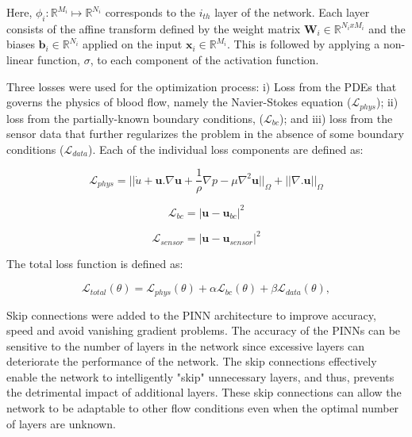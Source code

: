 \documentclass[times,twocolumn,final]{elsarticle}
\begin{document}
{Here, $\phi_{i}:\mathbb{R}^{M_{i}} \longmapsto \mathbb{R}^{N_{i}}$ corresponds to the $i_{th}$ layer of the network. Each layer consists of the affine transform defined by the weight matrix $\textbf{W}_{i} \in \mathbb{R}^{N_{i} x M_{i}}$ and the biases $\textbf{b}_i \in \mathbb{R}^{N_{i}}$ applied on the input $\textbf{x}_{i} \in \mathbb{R}^{M_{i}}$. This is followed by applying a non-linear function, $\sigma$, to each component of the activation function. 

Three losses were used for the optimization process: i) Loss from the PDEs that governs the physics of blood flow, namely the Navier-Stokes equation ($\mathcal{L}_{phys}$); ii) loss from the partially-known boundary conditions, ($\mathcal{L}_{bc}$); and iii) loss from the sensor data that further regularizes the problem in the absence of some boundary conditions ($\mathcal{L}_{data}$). Each of the individual loss components are defined as:

\begin{equation}
\mathcal{L}_{phys}=|| \dot{u} +  \textbf{u}.\nabla \textbf{u} + \frac{1}{\rho} \nabla p - \mu \nabla^{2} \textbf{u} ||_{\Omega} + ||\nabla . \textbf{u}||_{\Omega}
\end{equation}

\begin{equation}
\mathcal{L}_{bc}=|\textbf{u}-\textbf{u}_{bc}|^2
\end{equation}

\begin {equation}
\mathcal{L}_{sensor}=|\textbf{u}-\textbf{u}_{sensor}|^2
\end{equation}

 The total loss function is defined as:

\begin{equation}
\mathcal{L}_{total}(\theta)= \mathcal{L}_{phys}(\theta) + \alpha \mathcal{L}_{bc} (\theta) + \beta \mathcal{L}_{data}(\theta),
\end{equation}

Skip connections were added to the PINN architecture to improve accuracy, speed and avoid vanishing gradient problems. The accuracy of the PINNs can be sensitive to the number of layers in the network since excessive layers can deteriorate the performance of the network. The skip connections effectively enable the network to intelligently "skip" unnecessary layers, and thus, prevents the detrimental impact of additional layers. These skip connections can allow the network to be adaptable to other flow conditions even when the optimal number of layers are unknown.

}
\end{document}
